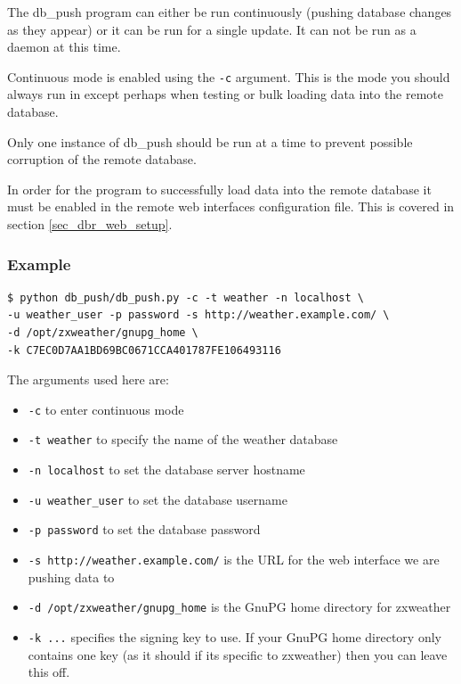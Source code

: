 \documentclass[a4paper,10pt,draft]{book}
\begin{document}
The db\_push program can either be run continuously (pushing database changes as they appear) or it can be run for a single update. It can not be run as a daemon at this time.

Continuous mode is enabled using the \verb|-c| argument. This is the mode you should always run in except perhaps when testing or bulk loading data into the remote database.

Only one instance of db\_push should be run at a time to prevent possible corruption of the remote database.

In order for the program to successfully load data into the remote database it must be enabled in the remote web interfaces configuration file. This is covered in section \ref{sec_dbr_web_setup}.

\subsubsection{Example}

\begin{verbatim}
$ python db_push/db_push.py -c -t weather -n localhost \
-u weather_user -p password -s http://weather.example.com/ \
-d /opt/zxweather/gnupg_home \
-k C7EC0D7AA1BD69BC0671CCA401787FE106493116
\end{verbatim}

The arguments used here are:
\begin{itemize}
\item \verb|-c| to enter continuous mode
\item \verb|-t weather| to specify the name of the weather database
\item \verb|-n localhost| to set the database server hostname
\item \verb|-u weather_user| to set the database username
\item \verb|-p password| to set the database password
\item \verb|-s http://weather.example.com/| is the URL for the web interface we are pushing data to
\item \verb|-d /opt/zxweather/gnupg_home| is the GnuPG home directory for zxweather
\item \verb|-k ...| specifies the signing key to use. If your GnuPG home directory only contains one key (as it should if its specific to zxweather) then you can leave this off.
\end{itemize}
\end{document}
